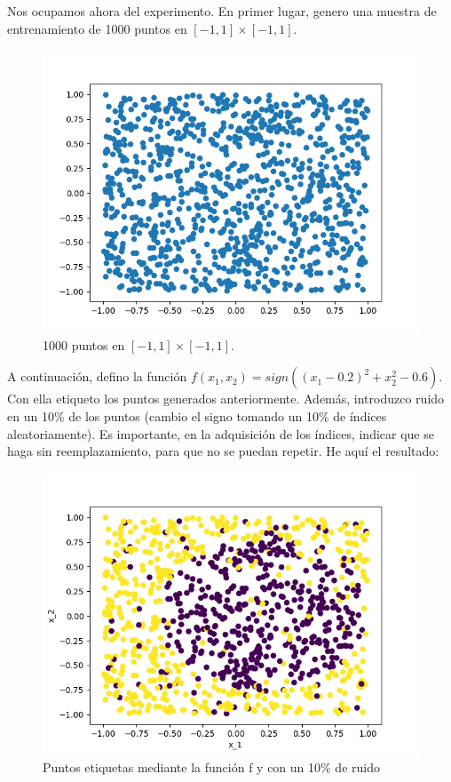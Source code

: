 Nos ocupamos ahora del experimento. En primer lugar, genero una muestra de entrenamiento de 1000 puntos en $[-1,1]\times[-1,1]$.
\begin{figure}[H] %
	\centering
	\includegraphics[scale=0.8]{puntos.png}  %
	\caption{1000 puntos en $[-1,1]\times[-1,1]$.} 
	\label{fig:puntos2D}
\end{figure}

A continuación, defino la función $f(x_1,x_2) = sign((x_1-0.2)^2+x_2^2-0.6)$. Con ella etiqueto los puntos generados anteriormente. Además, introduzco ruido en un 10\% de los puntos (cambio el signo tomando un 10\% de índices aleatoriamente). Es importante, en la adquisición de los índices, indicar que se haga sin reemplazamiento, para que no se puedan repetir. He aquí el resultado:

\begin{figure}[H] %
	\centering
	\includegraphics[scale=0.6]{puntos2.png}  %
	\caption{Puntos etiquetas mediante la función f y con un 10\% de ruido} 
	\label{fig:puntos2D-et}
\end{figure}
 
